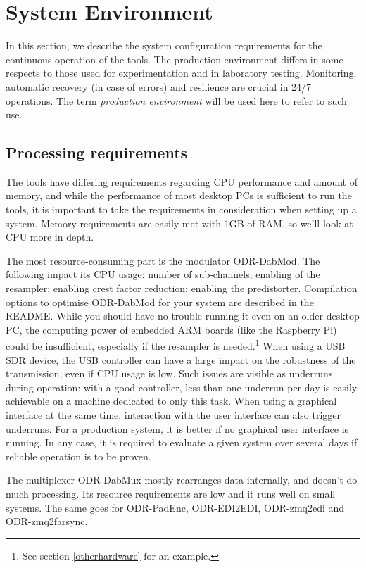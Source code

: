 \section{System Environment}
\label{systemenvironment}

In this section, we describe the system configuration requirements for the
continuous operation of the tools. The production environment differs in some
respects to those used for experimentation and in laboratory testing. Monitoring,
automatic recovery (in case of errors) and resilience are crucial in 24/7
operations. The term \emph{production environment} will be used here to refer to
such use.

\subsection{Processing requirements}

The tools have differing requirements regarding CPU performance and amount of
memory, and while the performance of most desktop PCs is sufficient to run the
tools, it is important to take the requirements in consideration when setting up
a system.
Memory requirements are easily met with 1GB of RAM, so we'll look at CPU more in
depth.

The most resource-consuming part is the modulator ODR-DabMod. The
following impact its CPU usage: number of sub-channels; enabling of the
resampler; enabling crest factor reduction; enabling the predistorter.
Compilation options to optimise ODR-DabMod for your system are described in the
README. While you should have no trouble running it even on an older desktop PC,
the computing power of embedded ARM boards (like the Raspberry Pi) could be
insufficient, especially if the resampler is needed.\footnote{See section
\ref{otherhardware} for an example.}
When using a USB SDR device, the USB controller can have a large impact on the
robustness of the transmission, even if CPU usage is low. Such issues are visible as
underruns during operation: with a good controller, less than one underrun per
day is easily achievable on a machine dedicated to only this task. When using
a graphical interface at the same time, interaction with the user interface can
also trigger underruns. For a production system, it is better if no graphical
user interface is running.
In any case, it is required to evaluate a given system over several days if
reliable operation is to be proven.

The multiplexer ODR-DabMux mostly rearranges data internally, and doesn't do
much processing. Its resource requirements are low and it runs well on small
systems. The same goes for ODR-PadEnc, ODR-EDI2EDI, ODR-zmq2edi and ODR-zmq2farsync.

